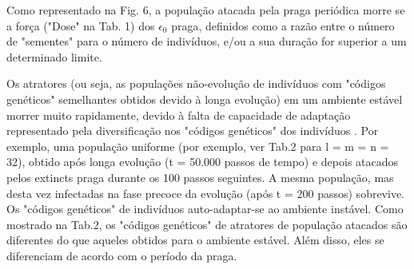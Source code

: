 \documentclass{article}
\begin{document}
Como representado na Fig. 6, a população atacada pela praga periódica morre se a força ("Dose" na Tab. 1) dos $\epsilon_{0}$ praga, definidos como a razão entre o número de "sementes" para o número de indivíduos, e/ou a sua duração for superior a um determinado limite.


Os atratores (ou seja, as populações não-evolução de indivíduos com "códigos genéticos" semelhantes obtidos devido à longa evolução) em um ambiente estável morrer muito rapidamente, devido à falta de capacidade de adaptação representado pela diversificação nos "códigos genéticos" dos indivíduos . Por exemplo, uma população uniforme (por exemplo, ver Tab.2 para l = m = n = 32), obtido após longa evolução (t = 50.000 passos de tempo) e depois atacados pelos extincts praga durante os 100 passos seguintes. A mesma população, mas desta vez infectadas na fase precoce da evolução (após t = 200 passos) sobrevive. Os "códigos genéticos" de indivíduos auto-adaptar-se ao ambiente instável. Como mostrado na Tab.2, os "códigos genéticos" de atratores de população atacados são diferentes do que aqueles obtidos para o ambiente estável. Além disso, eles se diferenciam de acordo com o período da praga.

\end{document}
